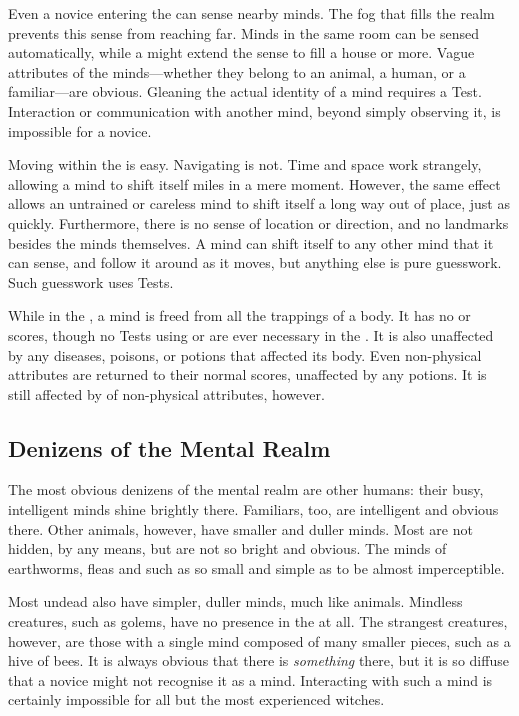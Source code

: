 Even a novice entering the {\mentalrealm} can sense nearby minds.
The fog that fills the realm prevents this sense from reaching far.
Minds in the same room can be sensed automatically, while a  might extend the sense to fill a house or more.
Vague attributes of the minds---whether they belong to an animal, a human, or a familiar---are obvious.
Gleaning the actual identity of a mind requires a Test.
Interaction or communication with another mind, beyond simply observing it, is impossible for a novice.

Moving within the {\mentalrealm} is easy.
Navigating is not.
Time and space work strangely, allowing a mind to shift itself miles in a mere moment.
However, the same effect allows an untrained or careless mind to shift itself a long way out of place, just as quickly.
Furthermore, there is no sense of location or direction, and no landmarks besides the minds themselves.
A mind can shift itself to any other mind that it can sense, and follow it around as it moves, but anything else is pure guesswork.
Such guesswork uses  Tests.

While in the {\mentalrealm}, a mind is freed from all the trappings of a body.
It has no  or  scores, though no Tests using  or  are ever necessary in the {\mentalrealm}.
It is also unaffected by any diseases, poisons, or potions that affected its body.
Even non-physical attributes are returned to their normal scores, unaffected by any potions.
It is still affected by {\exhaustion} of non-physical attributes, however.

\subsection{Denizens of the Mental Realm}

The most obvious denizens of the mental realm are other humans: their busy, intelligent minds shine brightly there.
Familiars, too, are intelligent and obvious there.
Other animals, however, have smaller and duller minds.
Most are not hidden, by any means, but are not so bright and obvious.
The minds of earthworms, fleas and such as so small and simple as to be almost imperceptible.

Most undead also have simpler, duller minds, much like animals.
Mindless creatures, such as golems, have no presence in the {\mentalrealm} at all.
The strangest creatures, however, are those with a single mind composed of many smaller pieces, such as a hive of bees.
It is always obvious that there is \emph{something} there, but it is so diffuse that a novice might not recognise it as a mind.
Interacting with such a mind is certainly impossible for all but the most experienced witches.

